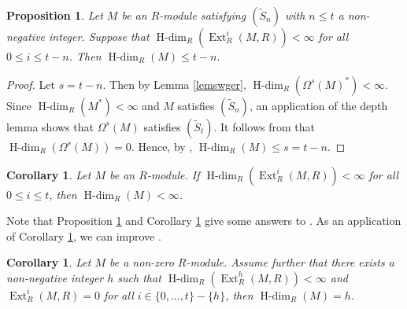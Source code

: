 \documentclass[11pt, a4paper,pagebackref]{amsart}
\numberwithin{equation}{section}
\newtheorem{proposition}[theorem]{Proposition}
\newtheorem{corollary}[theorem]{Corollary}
\theoremstyle{definition}
\newtheorem{remark and definition}[theorem]{Remark and Definition}
\newtheorem{remark and notation}[theorem]{Remark and Notation}
\newcommand\Ext{\operatorname{Ext}}
\newcommand\depth{\operatorname{depth}}
\DeclareMathOperator{\Hdim}{H-dim}
\begin{document}
\begin{proposition}\label{eqee}
Let $M$ be an $R$-module satisfying $(\widetilde{S}_n)$ with $n\leq t$ a non-negative integer. Suppose that  $\operatorname{H-dim}_R(\Ext_R^i(M,R))<\infty$ for all $0\leq i \leq t-n$. Then $\Hdim_R(M)\leq t-n$. 
\end{proposition}
\begin{proof} Let $s=t-n$. Then by Lemma \ref{lemswger}, $\operatorname{H-dim}_R(\Omega^s(M)^\ast)<\infty$. Since $\operatorname{H-dim}_R(M^\ast)<\infty$ and $M$ satisfies $(\widetilde{S}_n)$, an application of the depth lemma shows that  $\Omega^s(M)$ satisfies $(\widetilde{S}_{t})$. It follows from \cite[Proposition 13]{HomologicalDimensionsTheGorensteinPropertyAndSpecialCasesOfSomeConjectures} that $\operatorname{H-dim}_R(\Omega^s(M))=0$. Hence, by \cite[Theorem 8.7(3)]{HomologicalDimensionsAndRelatedInvariantsOfModulesOverLocalRings}, $\operatorname{H-dim}_R(M)\leq s=t-n$.
\end{proof}




\begin{corollary}\label{seq88a}
    Let $M$ be an $R$-module. If $\operatorname{H-dim}_R(\Ext_R^i(M,R))<\infty$ for all $0\leq i \leq t$, then $\operatorname{H-dim}_R(M)<\infty$.
\end{corollary}



Note that Proposition \ref{eqee} and Corollary \ref{seq88a} give some answers to \cite[Question 4.11]{OnModulesWhoseDualIsOfFiniteGorensteinDimension}. As an application of Corollary \ref{seq88a},  we can improve \cite[Proposition 3.3]{ARCForModulesWhose(Self)DualHasFiniteCompleteIntersectionDimensionv2}. %
\begin{corollary}\label{sedsm}\label{caj}
  Let $M$ be a non-zero $R$-module. Assume further that there exists a non-negative integer $h$ such that $\operatorname{H-dim}_R(\Ext_R^h(M,R))<\infty$ and $\operatorname{Ext}_R^i(M,R)=0$ for all $i \in \{0, \ldots, t\}-\{h\}$, then $\operatorname{H-dim}_R(M)=h$.
\end{corollary}
\end{document}
